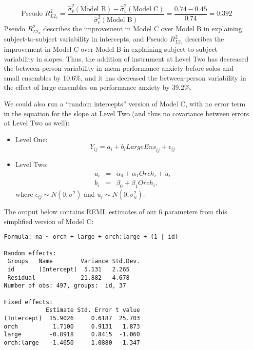 \documentclass[
]{krantz}
\begin{document}
\begin{equation}
\textrm{Pseudo }R^2_{L2_v} = \frac{\hat{\sigma}_{v}^{2}(\textrm{Model B})-\hat{\sigma}_{v}^{2}(\textrm{Model C})}{\hat{\sigma}_{v}^{2}(\textrm{Model B})} = \frac{0.74-0.45}{0.74} = 0.392
\label{eq:pseudol1}
\end{equation}
\(\textrm{Pseudo }R^2_{L2_u}\) describes the improvement in Model C over Model B in explaining subject-to-subject variability in intercepts, and \(\textrm{Pseudo }R^2_{L2_v}\) describes the improvement in Model C over Model B in explaining subject-to-subject variability in slopes. Thus, the addition of instrument at Level Two has decreased the between-person variability in mean performance anxiety before solos and small ensembles by 10.6\%, and it has decreased the between-person variability in the effect of large ensembles on performance anxiety by 39.2\%.

We could also run a ``random intercepts'' version of Model C, with no error term in the equation for the slope at Level Two (and thus no covariance between errors at Level Two as well):

\begin{itemize}
\item
  Level One:
  \begin{equation}
  Y_{ij} = a_{i}+b_{i}\textstyle{LargeEns}_{ij}+\epsilon_{ij}
  \label{eq:level1modelcrandint}
  \end{equation}
\item
  Level Two:
  \begin{eqnarray*}
  a_{i} & = & \alpha_{0}+\alpha_{1}\textstyle{Orch}_{i}+u_{i} \\
  b_{i} & = & \beta_{0}+\beta_{1}\textstyle{Orch}_{i},
  \end{eqnarray*}
  where \(\epsilon_{ij}\sim N(0,\sigma^2)\) and \(u_{i}\sim N(0,\sigma_{u}^{2})\).
\end{itemize}

The output below contains REML estimates of our 6 parameters from this simplified version of Model C:

\begin{verbatim}
Formula: na ~ orch + large + orch:large + (1 | id)

Random effects:
 Groups   Name        Variance Std.Dev.
 id       (Intercept)  5.131   2.265   
 Residual             21.882   4.678   
Number of obs: 497, groups:  id, 37

Fixed effects:
            Estimate Std. Error t value
(Intercept)  15.9026     0.6187  25.703
orch          1.7100     0.9131   1.873
large        -0.8918     0.8415  -1.060
orch:large   -1.4650     1.0880  -1.347
\end{verbatim}
\end{document}
